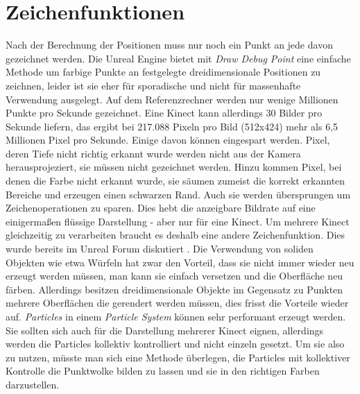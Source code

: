 \documentclass[a4paper]{IEEEtran}
\begin{document}
\section{Zeichenfunktionen}
	Nach der Berechnung der Positionen muss nur noch ein Punkt an jede davon gezeichnet werden. 
	Die Unreal Engine bietet mit {\textit{Draw Debug Point}} eine einfache Methode um farbige Punkte an festgelegte dreidimensionale Positionen zu zeichnen, leider ist sie eher für sporadische und nicht für massenhafte Verwendung ausgelegt. 
	Auf dem Referenzrechner werden nur wenige Millionen Punkte pro Sekunde gezeichnet. 
	Eine Kinect kann allerdings 30 Bilder pro Sekunde liefern, das ergibt bei 217.088 Pixeln pro Bild (512x424) mehr als 6,5 Millionen Pixel pro Sekunde. 
	Einige davon können eingespart werden. 
	Pixel, deren Tiefe nicht richtig erkannt wurde werden nicht aus der Kamera herausprojeziert, sie müssen nicht gezeichnet werden. 
	Hinzu kommen Pixel, bei denen die Farbe nicht erkannt wurde, sie säumen zumeist die korrekt erkannten Bereiche und erzeugen einen schwarzen Rand. 
	Auch sie werden übersprungen um Zeichenoperationen zu sparen. 
	Dies hebt die anzeigbare Bildrate auf eine einigermaßen flüssige Darstellung - aber nur für eine Kinect. 
	Um mehrere Kinect gleichzeitig zu verarbeiten braucht es deshalb eine andere Zeichenfunktion.
	Dies wurde bereits im Unreal Forum diskutiert {\cite{lidar}}.
	Die Verwendung von soliden Objekten wie etwa Würfeln hat zwar den Vorteil, dass sie nicht immer wieder neu erzeugt werden müssen, man kann sie einfach versetzen und die Oberfläche neu färben. 
	Allerdings besitzen dreidimensionale Objekte im Gegensatz zu Punkten mehrere Oberflächen die gerendert werden müssen, dies frisst die Vorteile wieder auf.
	{\textit{Particles}} in einem {\textit{Particle System}} können sehr performant erzeugt werden. 
	Sie sollten sich auch für die Darstellung mehrerer Kinect eignen, allerdings werden die Particles kollektiv kontrolliert und nicht einzeln gesetzt. 
	Um sie also zu nutzen, müsste man sich eine Methode überlegen, die Particles mit kollektiver Kontrolle die Punktwolke bilden zu lassen und sie in den richtigen Farben darzustellen. \\[0.5cm]
	
	
\end{document}
